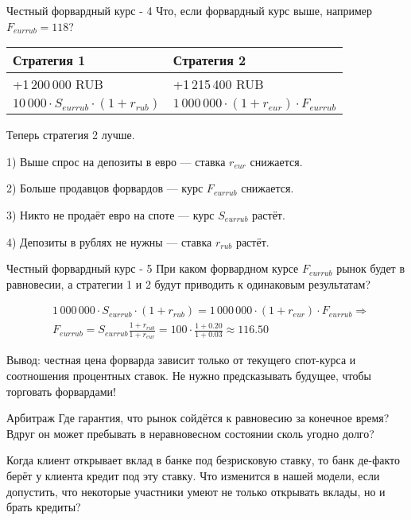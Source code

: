 \documentclass{beamer}
\begin{document}
\begin{frame}{Честный форвардный курс - 4}
\justify
Что, если форвардный курс выше, например $F_{eurrub}=118$?


\justify
\centering
\begin{tabular}{l|l}
Стратегия 1 & Стратегия 2 \\ \hline
+1\,200\,000 RUB  & +1\,215\,400 RUB \\
$10\,000 \cdot S_{eurrub} \cdot (1+r_{rub})$ & $1\,000\,000 \cdot (1+r_{eur}) \cdot F_{eurrub}$
\end{tabular}

\justify
Теперь стратегия 2 лучше. 

1) Выше спрос на депозиты в евро --- ставка $r_{eur}$ снижается.

2) Больше продавцов форвардов --- курс $F_{eurrub}$ снижается.

3) Никто не продаёт евро на споте --- курс $S_{eurrub}$ растёт. 

4) Депозиты в рублях не нужны --- ставка $r_{rub}$ растёт.
\end{frame}



\begin{frame}{Честный форвардный курс - 5}
\justify
При каком форвардном курсе $F_{eurrub}$ рынок будет в равновесии, а стратегии 1 и 2 будут приводить к одинаковым результатам?

\begin{align*}
&1\,000\,000 \cdot S_{eurrub} \cdot (1 + r_{rub}) = 1\,000\,000 \cdot (1+r_{eur}) \cdot F_{eurrub} \Rightarrow \\
&F_{eurrub} = S_{eurrub} \frac{1 + r_{rub}}{1 + r_{eur}} = 100 \cdot \frac{1 + 0.20}{1 + 0.03} \approx 116.50
\end{align*}

\justify
Вывод: честная цена форварда зависит только от текущего спот-курса и соотношения процентных ставок. Не нужно предсказывать будущее, чтобы торговать форвардами!
\end{frame}



\begin{frame}{Арбитраж}
\justify
Где гарантия, что рынок сойдётся к равновесию за конечное время? Вдруг он может пребывать в неравновесном состоянии сколь угодно долго?

\justify
Когда клиент открывает вклад в банке под безрисковую ставку, то банк де-факто берёт у клиента кредит под эту ставку. Что изменится в нашей модели, если допустить, что некоторые участники умеют не только открывать вклады, но и брать кредиты?
\end{frame}
\end{document}
